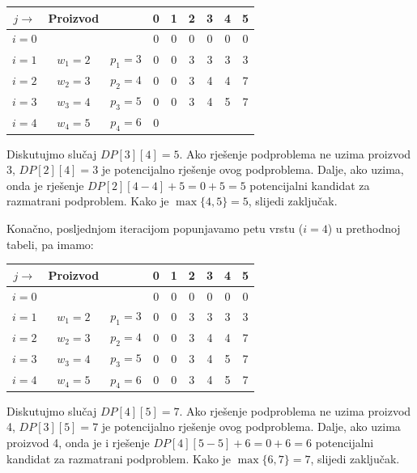   \begin{table}[H]
	\centering
	\begin{tabular}{|c|cc|cccccc|}\hline
		
		$j\rightarrow$	& Proizvod   &              &	 	0	&1&	2	&3	&4	&5 \\ \hline
		
		$i=0$ & 	& 	    & 	    0	&0	&0	&0	&0	&0  \\
		$i=1$ &	$w_1=2$	&$p_1=3$ &	0	&0 	&3 	&3 	&3 	&3\\ 
		$i=2$ &	$w_2=3$	&$p_2=4$ &	0   &0	&3 	&4 	&4	&7\\	 
		$i=3$ &	$w_3=4$	&$p_3=5$ &	0	&0 	&3 	&4 	&5 	&7 \\ 
		$i=4$ &	$w_4=5$ &$p_4=6$ &	0	& 	& 	& 	& 	&\\ \hline
	\end{tabular}
\end{table}
 Diskutujmo slučaj $DP[3][4]=5$.   Ako rješenje podproblema ne uzima proizvod 3, $DP[2][4]=3 $ je potencijalno rješenje ovog podproblema. Dalje, ako uzima, onda je rješenje $DP[2][4-4] + 5 = 0 + 5 = 5$ potencijalni kandidat za razmatrani podproblem. Kako je $\max\{4, 5\}=5$, slijedi zaključak.
 
   Konačno, posljednjom iteracijom popunjavamo petu vrstu ($i=4$) u prethodnoj tabeli, pa imamo: 
 
 \begin{table}[H]
 	\centering
 	\begin{tabular}{|c|cc|cccccc|}\hline
 		
 		$j\rightarrow$	& Proizvod   &              &	 	0	&1&	2	&3	&4	&5 \\ \hline
 		
 		$i=0$ & 	& 	    & 	    0	&0	&0	&0	&0	&0  \\
 		$i=1$ &	$w_1=2$	&$p_1=3$ &	0	&0 	&3 	&3 	&3 	&3\\ 
 		$i=2$ &	$w_2=3$	&$p_2=4$ &	0   &0	&3 	&4 	&4	&7\\	 
 		$i=3$ &	$w_3=4$	&$p_3=5$ &	0	&0 	&3 	&4 	&5 	&7 \\ 
 		$i=4$ &	$w_4=5$ &$p_4=6$ &	0	&0 	&3 	&4 	&5 	&7\\ \hline
 	\end{tabular}
 \end{table}

 Diskutujmo slučaj $DP[4][5]=7$.  Ako rješenje podproblema ne uzima proizvod 4, $DP[3][5]=7$ je potencijalno rješenje ovog podproblema. Dalje, ako uzima proizvod 4, onda  je i rješenje $DP[4][5-5] + 6 = 0 + 6 = 6$ potencijalni kandidat za razmatrani podproblem. Kako je $\max\{6, 7\}=7$, slijedi zaključak.
 
